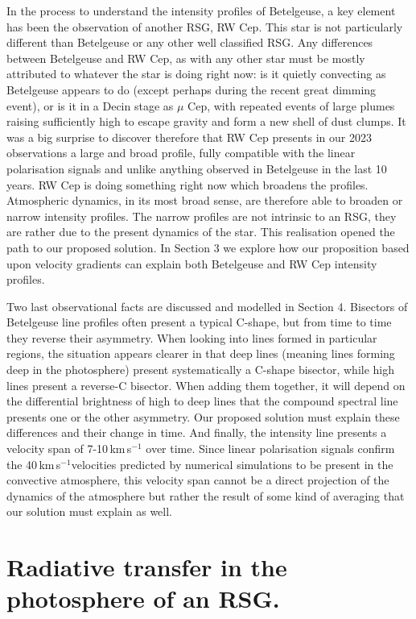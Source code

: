 \documentclass{/Users/art2/TeX/aanda/aa}
\def\kms {km\,s$^{-1}$}
\begin{document}
In the process to understand the intensity profiles of Betelgeuse, a key element has been the observation of another RSG, RW Cep. This star 
is not particularly different than Betelgeuse or any other well classified RSG. Any differences between Betelgeuse and RW Cep, as with any other star 
must be mostly attributed to whatever the star is doing right now: is it quietly convecting as Betelgeuse appears to do (except perhaps during 
the recent great dimming event), or is it in a Decin stage as $\mu$ Cep, with repeated events of large plumes raising sufficiently high to escape 
gravity and form a new shell of dust clumps. It was a big surprise to discover therefore that RW Cep presents in our 2023 observations a large and 
broad profile, fully compatible with the linear polarisation signals and unlike anything observed in Betelgeuse in the last 10 years. RW Cep is 
doing something right now which broadens the profiles. Atmospheric dynamics, in its most broad sense, are therefore able to broaden or narrow intensity 
profiles. The narrow profiles are not intrinsic to an RSG, they are rather due to the present dynamics of the star. This realisation opened the path 
to our proposed solution. In Section 3 we explore how our proposition based upon velocity gradients can explain both Betelgeuse and RW Cep intensity 
profiles.

Two last observational facts are discussed and modelled in Section 4. Bisectors of Betelgeuse line profiles often present a typical C-shape, but 
from time to time they reverse their asymmetry. When looking into lines formed in particular regions, the situation appears clearer in that deep 
lines (meaning lines forming deep in the photosphere) present systematically a C-shape bisector, while high lines present a reverse-C bisector. When
adding them together, it will depend on the differential brightness of high to deep lines that the compound spectral line presents one or the other asymmetry.
Our proposed solution must explain these differences and their change in time. And finally, the intensity line presents a velocity span of 7-10\,\kms 
over time. Since linear polarisation signals confirm the 40\,\kms velocities  predicted by numerical simulations to be present in the convective atmosphere, 
this  velocity span cannot be a direct projection of the dynamics of the atmosphere but rather the result of some kind of averaging that our solution 
must explain as well.




\section{Radiative transfer in the photosphere of an RSG.}
\end{document}
